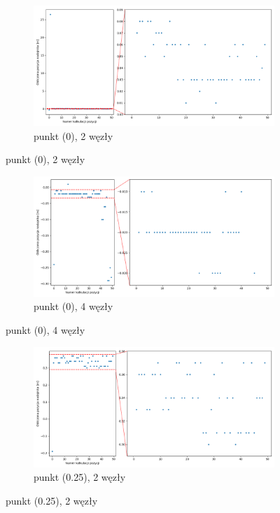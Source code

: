 \begin{figure}[H]
    \centering
    \begin{subfigure}{\textwidth}
        \centering
        \includegraphics[width=\linewidth]{pics/mult_lat_1d/position_[0]_2.png}
        \caption{punkt (0), 2 węzły}
        \label{pic:1d_mult_[0]_2}
    \end{subfigure}
\end{figure}
\begin{figure}[H]
    \ContinuedFloat\centering
    \begin{subfigure}{\textwidth}
        \centering
        \includegraphics[width=\linewidth]{pics/mult_lat_1d/position_[0]_4.png}
        \caption{punkt (0), 4 węzły}
        \label{pic:1d_mult_[0]_4}
    \end{subfigure}
\end{figure}
\begin{figure}[H]
    \ContinuedFloat\centering
    \begin{subfigure}{\textwidth}
        \centering
        \includegraphics[width=\linewidth]{pics/mult_lat_1d/position_[0.25]_2.png}
        \caption{punkt (0.25), 2 węzły}
        \label{pic:1d_mult_[0.25]_2}
    \end{subfigure}
\end{figure}
